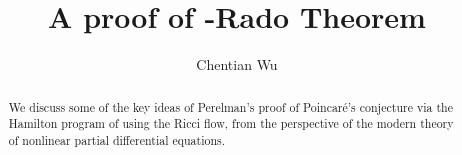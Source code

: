 \documentclass{amsart}
\title{A proof of \Erdos-Rado Theorem}
\author{Chentian Wu}
\date{}
\theoremstyle{plain}
\theoremstyle{definition}
\begin{document}
\maketitle

\begin{abstract}
We discuss some of the key ideas of Perelman's proof of  Poincaré's conjecture via the Hamilton program of using  the Ricci flow, from the perspective of the modern theory of nonlinear partial differential equations.
\end{abstract}

\tableofcontents
\newpage





\end{document}
